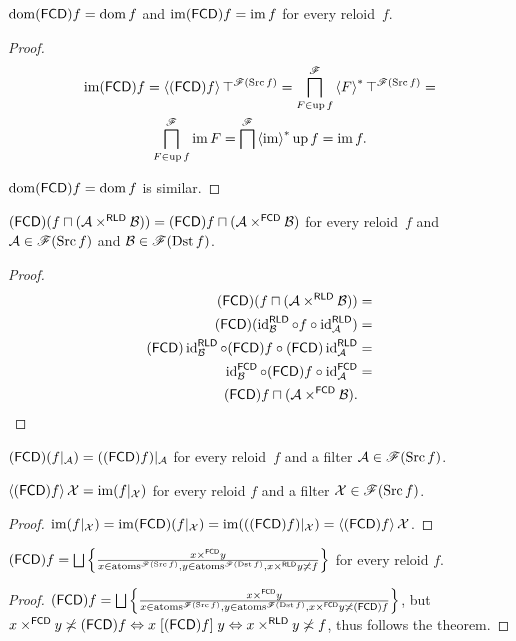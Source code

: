 \begin{prop}
$\operatorname{dom}(\mathsf{FCD}) f=\operatorname{dom} f$ and $\operatorname{im}(\mathsf{FCD}) f=\operatorname{im} f$ for every reloid~$f$.\end{prop}
\begin{proof}
~
\begin{multline*}
\operatorname{im}(\mathsf{FCD}) f=\left\langle (\mathsf{FCD}) f\right\rangle\top^{\mathscr{F}(\operatorname{Src} f)}=\bigsqcap_{F\in\operatorname{up} f}^{\mathscr{F}}\left\langle F\right\rangle ^{\ast}\top^{\mathscr{F}(\operatorname{Src} f)}=\\
\bigsqcap_{F\in\operatorname{up} f}^{\mathscr{F}}\operatorname{im} F=\bigsqcap^{\mathscr{F}}\left\langle \operatorname{im}\right\rangle ^{\ast}\operatorname{up} f=\operatorname{im} f.
\end{multline*}


$\operatorname{dom}(\mathsf{FCD}) f=\operatorname{dom} f$ is similar.\end{proof}
\begin{prop}\label{fcd-meet-prod-rld}
$(\mathsf{FCD})(f\sqcap(\mathcal{A}\times^{\mathsf{RLD}}\mathcal{B}))=(\mathsf{FCD}) f\sqcap(\mathcal{A}\times^{\mathsf{FCD}}\mathcal{B})$
for every reloid~$f$ and $\mathcal{A}\in\mathscr{F}(\operatorname{Src} f)$ and
$\mathcal{B}\in\mathscr{F}(\operatorname{Dst} f)$.\end{prop}
\begin{proof}
~
\begin{align*}
(\mathsf{FCD})(f\sqcap(\mathcal{A}\times^{\mathsf{RLD}}\mathcal{B})) & =\\
(\mathsf{FCD})(\operatorname{id}_{\mathcal{B}}^{\mathsf{RLD}}\circ f\circ\operatorname{id}_{\mathcal{A}}^{\mathsf{RLD}}) & =\\
(\mathsf{FCD})\operatorname{id}_{\mathcal{B}}^{\mathsf{RLD}}\circ(\mathsf{FCD}) f\circ(\mathsf{FCD})\operatorname{id}_{\mathcal{A}}^{\mathsf{RLD}} & =\\
\operatorname{id}_{\mathcal{B}}^{\mathsf{FCD}}\circ(\mathsf{FCD}) f\circ\operatorname{id}_{\mathcal{A}}^{\mathsf{FCD}} & =\\
(\mathsf{FCD}) f\sqcap(\mathcal{A}\times^{\mathsf{FCD}}\mathcal{B}).
\end{align*}
\end{proof}
\begin{cor}
$(\mathsf{FCD})(f|_{\mathcal{A}})=((\mathsf{FCD}) f)|_{\mathcal{A}}$ for every reloid~$f$
and a filter $\mathcal{A}\in\mathscr{F}(\operatorname{Src} f)$.\end{cor}
\begin{prop}
$\left\langle (\mathsf{FCD}) f\right\rangle\mathcal{X}=\operatorname{im}(f|_{\mathcal{X}})$ for every reloid
$f$ and a filter $\mathcal{X}\in\mathscr{F}(\operatorname{Src} f)$.\end{prop}
\begin{proof}
$\operatorname{im}(f|_{\mathcal{X}})=\operatorname{im}(\mathsf{FCD})(f|_{\mathcal{X}})=\operatorname{im}(((\mathsf{FCD}) f)|_{\mathcal{X}})=\left\langle (\mathsf{FCD}) f\right\rangle\mathcal{X}$.\end{proof}
\begin{prop}
$\tofcd f=\bigsqcup\setcond{x\times^{\mathsf{FCD}}y}{x\in\atoms^{\mathscr{F}(\Src f)},y\in\atoms^{\mathscr{F}(\Dst f)},x\times^{\mathsf{RLD}}y\nasymp f}$
for every reloid $f$.\end{prop}
\begin{proof}
$\tofcd f=\bigsqcup\setcond{x\times^{\mathsf{FCD}}y}{x\in\atoms^{\mathscr{F}(\Src f)},y\in\atoms^{\mathscr{F}(\Dst f)},x\times^{\mathsf{FCD}}y\nasymp\tofcd f}$,
but $x\times^{\mathsf{FCD}}y\not\asymp(\mathsf{FCD}) f\Leftrightarrow x\mathrel{\left[(\mathsf{FCD}) f\right]}y\Leftrightarrow x\times^{\mathsf{RLD}}y\not\asymp f$,
thus follows the theorem.
\end{proof}

